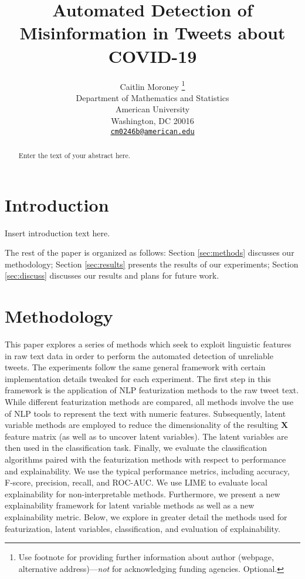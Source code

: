 \documentclass{article}
\title{Automated Detection of Misinformation in Tweets about COVID-19}
\author{
    Caitlin Moroney
    \thanks{Use footnote for providing further information about author (webpage,
alternative address)---\emph{not} for acknowledging funding agencies.
Optional.}
   \\
    Department of Mathematics and Statistics \\
    American University \\
  Washington, DC 20016 \\
  \texttt{\href{mailto:cm0246b@american.edu}{\nolinkurl{cm0246b@american.edu}}} \\
  }
\begin{document}
\maketitle

\def\tightlist{}


\begin{abstract}
Enter the text of your abstract here.
\end{abstract}


\hypertarget{introduction}{%
\section{Introduction}\label{introduction}}

Insert introduction text here.

The rest of the paper is organized as follows: Section \ref{sec:methods}
discusses our methodology; Section \ref{sec:results} presents the
results of our experiments; Section \ref{sec:discuss} discusses our
results and plans for future work.

\hypertarget{methodology}{%
\section{Methodology}\label{methodology}}

\label{sec:methods} This paper explores a series of methods which seek
to exploit linguistic features in raw text data in order to perform the
automated detection of unreliable tweets. The experiments follow the
same general framework with certain implementation details tweaked for
each experiment. The first step in this framework is the application of
NLP featurization methods to the raw tweet text. While different
featurization methods are compared, all methods involve the use of NLP
tools to represent the text with numeric features. Subsequently, latent
variable methods are employed to reduce the dimensionality of the
resulting \(\mathbf{X}\) feature matrix (as well as to uncover latent
variables). The latent variables are then used in the classification
task. Finally, we evaluate the classification algorithms paired with the
featurization methods with respect to performance and explainability. We
use the typical performance metrics, including accuracy, F-score,
precision, recall, and ROC-AUC. We use LIME to evaluate local
explainability for non-interpretable methods. Furthermore, we present a
new explainability framework for latent variable methods as well as a
new explainability metric. Below, we explore in greater detail the
methods used for featurization, latent variables, classification, and
evaluation of explainability.
\end{document}
